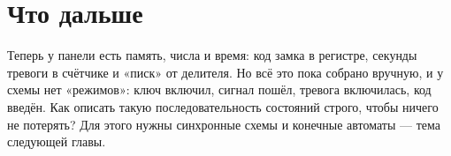 \section{Что дальше}

Теперь у панели есть память, числа и время: код замка в регистре, секунды
тревоги в счётчике и «писк» от делителя. Но всё это пока собрано вручную, и
у схемы нет «режимов»: ключ включил, сигнал пошёл, тревога включилась, код
введён. Как описать такую последовательность состояний строго, чтобы ничего
не потерять? Для этого нужны синхронные схемы и конечные автоматы --- тема
следующей главы.
